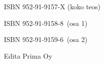 \chapter*{ }
\thispagestyle{empty}

\rule{0mm}{6mm}

\newpage
\thispagestyle{empty}

\rule{0mm}{6mm}

\vspace{17cm}

\rule{0mm}{2mm} \hspace{7cm} ISBN 952-91-9157-X   (koko teos) \\
\rule{0mm}{2mm} \hspace{7cm} ISBN 952-91-9158-8\, (osa 1) \\
\rule{0mm}{2mm} \hspace{7cm} ISBN 952-91-9159-6\, (osa 2) \\[5mm]
\rule{0mm}{2mm} \hspace{7cm} Edita Prima Oy